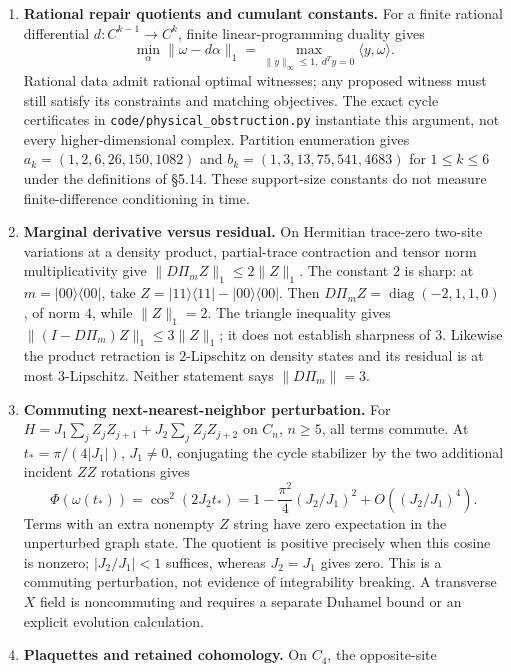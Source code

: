 \documentclass[
  11pt,
]{article}
\begin{document}
\begin{enumerate}
\def\labelenumi{\arabic{enumi}.}
\item
  \textbf{Rational repair quotients and cumulant constants.} For a finite rational
  differential \(d:C^{k-1}\to C^k\), finite linear-programming duality gives
  \[
  \min_\alpha\|\omega-d\alpha\|_1
  =\max_{\|y\|_\infty\le1,\ d^Ty=0}\langle y,\omega\rangle.
  \]
  Rational data admit rational optimal witnesses; any proposed witness must
  still satisfy its constraints and matching objectives. The exact cycle
  certificates in \texttt{code/physical\_obstruction.py} instantiate this argument,
  not every higher-dimensional complex. Partition enumeration gives
  \(a_k=(1,2,6,26,150,1082)\) and \(b_k=(1,3,13,75,541,4683)\) for \(1\le k\le6\)
  under the definitions of §5.14. These support-size constants do not measure
  finite-difference conditioning in time.
\item
  \textbf{Marginal derivative versus residual.} On Hermitian trace-zero two-site
  variations at a density product, partial-trace contraction and tensor norm
  multiplicativity give \(\|D\Pi_m Z\|_1\le2\|Z\|_1\). The constant \(2\) is sharp:
  at \(m=|00\rangle\langle00|\), take
  \(Z=|11\rangle\langle11|-|00\rangle\langle00|\). Then
  \(D\Pi_m Z=\operatorname{diag}(-2,1,1,0)\), of norm \(4\), while \(\|Z\|_1=2\).
  The triangle inequality gives \(\|(I-D\Pi_m)Z\|_1\le3\|Z\|_1\);
  it does not establish sharpness of \(3\). Likewise the product retraction
  is \(2\)-Lipschitz on density states and its residual is at most
  \(3\)-Lipschitz. Neither statement says \(\|D\Pi_m\|=3\).
\item
  \textbf{Commuting next-nearest-neighbor perturbation.} For
  \(H=J_1\sum_jZ_jZ_{j+1}+J_2\sum_jZ_jZ_{j+2}\) on \(C_n\), \(n\ge5\), all terms
  commute. At \(t_*=\pi/(4|J_1|)\), \(J_1\ne0\), conjugating the cycle stabilizer
  by the two additional incident \(ZZ\) rotations gives
  \[
  \Phi(\omega(t_*))=\cos^2(2J_2t_*)
  =1-\frac{\pi^2}{4}(J_2/J_1)^2+O((J_2/J_1)^4).
  \]
  Terms with an extra nonempty \(Z\) string have zero expectation in the
  unperturbed graph state. The quotient is positive precisely when this
  cosine is nonzero; \(|J_2/J_1|<1\) suffices, whereas \(J_2=J_1\) gives zero.
  This is a commuting perturbation, not evidence of integrability breaking.
  A transverse \(X\) field is noncommuting and requires a separate Duhamel
  bound or an explicit evolution calculation.
\item
  \textbf{Plaquettes and retained cohomology.} On \(C_4\), the opposite-site

\end{enumerate}
\end{document}
